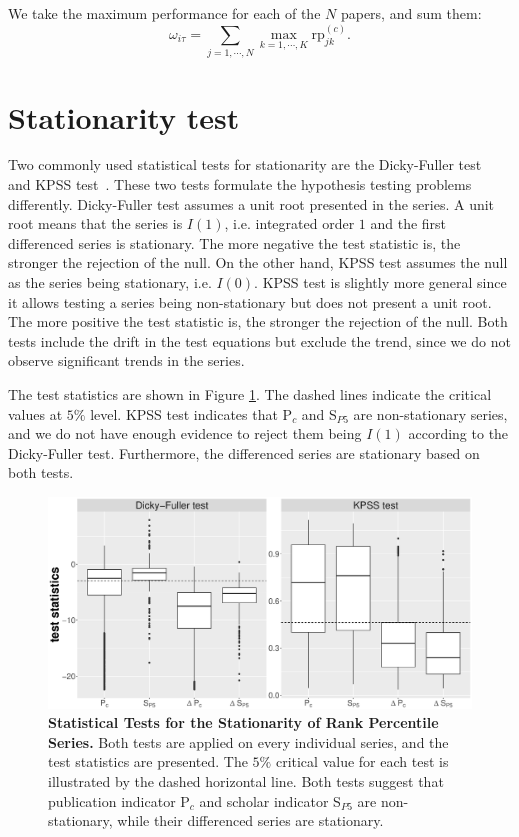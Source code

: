 \begin{refsection}
We take the maximum performance for each of the $N$ papers, and sum them:
\begin{equation}
    \omega_{i \tau} = \sum_{j=1,\cdots,N} \max_{k=1,\cdots, K} \text{rp}_{j k} ^{(c)}.
\end{equation}
\fi

\section{Stationarity test}
\label{sec:suppl_stationarity}

Two commonly used statistical tests for stationarity are the Dicky-Fuller test~\cite{dickey1979distribution} and KPSS test~\cite{kwiatkowski1992testing}. These two tests formulate the hypothesis testing problems differently. Dicky-Fuller test assumes a unit root presented in the series. A unit root means that the series is $I(1)$, i.e. integrated order $1$ and the first differenced series is stationary. The more negative the test statistic is, the stronger the rejection of the null. On the other hand, KPSS test assumes the null as the series being stationary, i.e. $I(0)$. KPSS test is slightly more general since it allows testing a series being non-stationary but does not present a unit root. The more positive the test statistic is, the stronger the rejection of the null. Both tests include the drift in the test equations but exclude the trend, since we do not observe significant trends in the series. 

The test statistics are shown in Figure \ref{fig:stationarity_test}. The dashed lines indicate the critical values at $5 \%$ level. KPSS test indicates that P$_c$ and S$_{P5}$ are non-stationary series, and we do not have enough evidence to reject them being $I(1)$ according to the Dicky-Fuller test. Furthermore, the differenced series are stationary based on both tests.


\begin{figure}[ht!]
    \centering
    \includegraphics[width=\textwidth]{figures/stationarity/df_kpss.eps}
    \caption{{\bf Statistical Tests for the Stationarity of Rank Percentile Series.}
    Both tests are applied on every individual series, and the test statistics are presented. The $5\%$ critical value for each test is illustrated by the dashed horizontal line. Both tests suggest that publication indicator P$_c$ and scholar indicator S$_{P5}$ are non-stationary, while their differenced series are stationary. }
    \label{fig:stationarity_test}
\end{figure}


\end{refsection}
